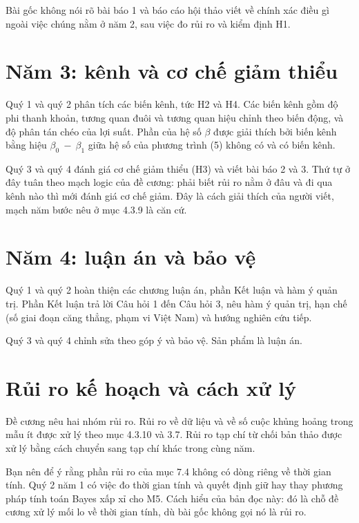 Bài gốc không nói rõ bài báo 1 và báo cáo hội thảo viết về chính xác điều gì ngoài việc chúng nằm ở năm 2, sau việc đo rủi ro và kiểm định H1.

\section{Năm 3: kênh và cơ chế giảm thiểu}

Quý 1 và quý 2 phân tích các biến kênh, tức H2 và H4. Các biến kênh gồm độ phi thanh khoản, tương quan đuôi và tương quan hiệu chỉnh theo biến động, và độ phân tán chéo của lợi suất. Phần của hệ số \(\beta\) được giải thích bởi biến kênh bằng hiệu \(\beta_{0}\  - \ \beta_{1}\) giữa hệ số của phương trình (5) không có và có biến kênh.

Quý 3 và quý 4 đánh giá cơ chế giảm thiểu (H3) và viết bài báo 2 và 3. Thứ tự ở đây tuân theo mạch logic của đề cương: phải biết rủi ro nằm ở đâu và đi qua kênh nào thì mới đánh giá cơ chế giảm. Đây là cách giải thích của người viết, mạch năm bước nêu ở mục 4.3.9 là căn cứ.

\section{Năm 4: luận án và bảo vệ}

Quý 1 và quý 2 hoàn thiện các chương luận án, phần Kết luận và hàm ý quản trị. Phần Kết luận trả lời Câu hỏi 1 đến Câu hỏi 3, nêu hàm ý quản trị, hạn chế (số giai đoạn căng thẳng, phạm vi Việt Nam) và hướng nghiên cứu tiếp.

Quý 3 và quý 4 chỉnh sửa theo góp ý và bảo vệ. Sản phẩm là luận án.

\section{Rủi ro kế hoạch và cách xử lý}

Đề cương nêu hai nhóm rủi ro. Rủi ro về dữ liệu và về số cuộc khủng hoảng trong mẫu ít được xử lý theo mục 4.3.10 và 3.7. Rủi ro tạp chí từ chối bản thảo được xử lý bằng cách chuyển sang tạp chí khác trong cùng năm.

Bạn nên để ý rằng phần rủi ro của mục 7.4 không có dòng riêng về thời gian tính. Quý 2 năm 1 có việc đo thời gian tính và quyết định giữ hay thay phương pháp tính toán Bayes xấp xỉ cho M5. Cách hiểu của bản đọc này: đó là chỗ đề cương xử lý mối lo về thời gian tính, dù bài gốc không gọi nó là rủi ro.

